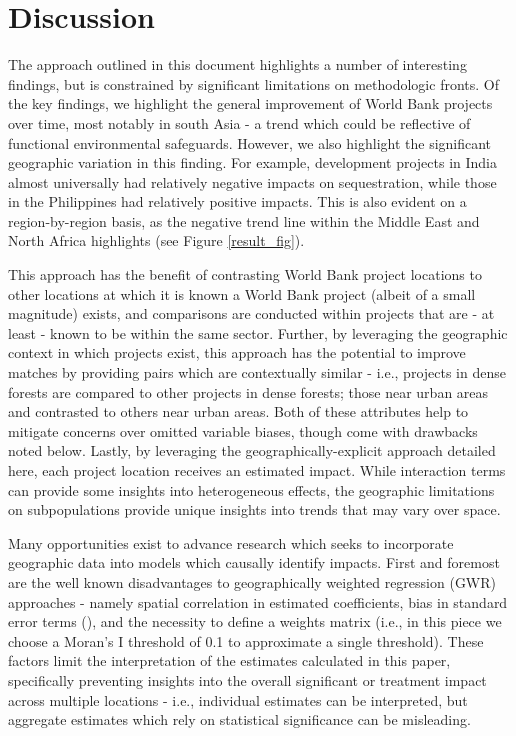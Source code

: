 \documentclass{article}\usepackage[]{graphicx}\usepackage[]{color}
\newenvironment{knitrout}{}{}  %
\begin{document}
\begin{knitrout}
\section{Discussion}
The approach outlined in this document highlights a number of interesting findings, but is constrained by significant limitations on methodologic fronts.
Of the key findings, we highlight the general improvement of World Bank projects over time, most notably in south Asia - a trend which could be reflective of functional environmental safeguards.  
However, we also highlight the significant geographic variation in this finding.  For example, development projects in India almost universally had relatively negative impacts on sequestration, while those in the Philippines had relatively positive impacts.  
This is also evident on a region-by-region basis, as the negative trend line within the Middle East and North Africa highlights (see Figure \ref{result_fig}).  
\par
This approach has the benefit of contrasting World Bank project locations to other locations at which it is known a World Bank project (albeit of a small magnitude) exists, and comparisons are conducted within projects that are - at least - known to be within the same sector. 
Further, by leveraging the geographic context in which projects exist, this approach has the potential to improve matches by providing pairs which are contextually similar - i.e., projects in dense forests are compared to other projects in dense forests; those near urban areas and contrasted to others near urban areas.
Both of these attributes help to mitigate concerns over omitted variable biases, though come with drawbacks noted below.
Lastly, by leveraging the geographically-explicit approach detailed here, each project location receives an estimated impact.
While interaction terms can provide some insights into heterogeneous effects, the geographic limitations on subpopulations provide unique insights into trends that may vary over space.
\par
Many opportunities exist to advance research which seeks to incorporate geographic data into models which causally identify impacts.
First and foremost are the well known disadvantages to geographically weighted regression (GWR) approaches - namely spatial correlation in estimated coefficients, bias in standard error terms (\cite{wheeler_multicollinearity_2005}), and the necessity to define a weights matrix (i.e., in this piece we choose a Moran's I threshold of 0.1 to approximate a single threshold).  
These factors limit the interpretation of the estimates calculated in this paper, specifically preventing insights into the overall significant or treatment impact across multiple locations - i.e., individual estimates can be interpreted, but aggregate estimates which rely on statistical significance can be misleading.

\end{knitrout}
\end{document}
